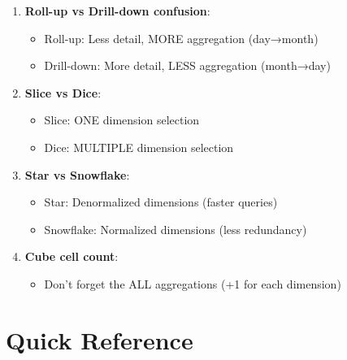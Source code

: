 \begin{warningbox}
\begin{enumerate}
    \item \textbf{Roll-up vs Drill-down confusion}:
    \begin{itemize}
        \item Roll-up: Less detail, MORE aggregation (day→month)
        \item Drill-down: More detail, LESS aggregation (month→day)
    \end{itemize}

    \item \textbf{Slice vs Dice}:
    \begin{itemize}
        \item Slice: ONE dimension selection
        \item Dice: MULTIPLE dimension selection
    \end{itemize}

    \item \textbf{Star vs Snowflake}:
    \begin{itemize}
        \item Star: Denormalized dimensions (faster queries)
        \item Snowflake: Normalized dimensions (less redundancy)
    \end{itemize}

    \item \textbf{Cube cell count}:
    \begin{itemize}
        \item Don't forget the ALL aggregations (+1 for each dimension)
    \end{itemize}
\end{enumerate}
\end{warningbox}

\section{Quick Reference}


